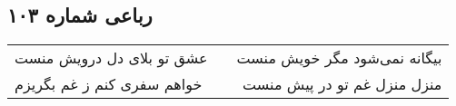 \begin{center}
\section*{رباعی شماره ۱۰۳}
\label{sec:sh103}
\begin{longtable}{l p{0.5cm} r}
عشق تو بلای دل درویش منست
&&
بیگانه نمی‌شود مگر خویش منست
\\
خواهم سفری کنم ز غم بگریزم
&&
منزل منزل غم تو در پیش منست
\\
\end{longtable}
\end{center}

